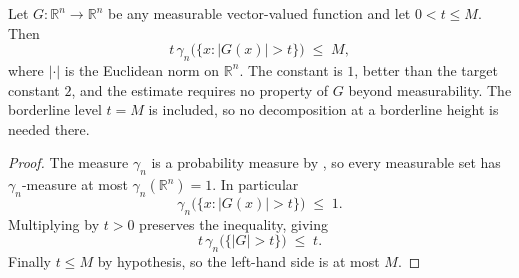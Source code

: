 \begin{lemma}
Let $G : \mathbb{R}^n \to \mathbb{R}^n$ be any measurable vector-valued function
and let $0 < t \leq M$.  Then
\[
  t\,\gamma_n\bigl(\{x : |G(x)| > t\}\bigr) \;\leq\; M ,
\]
where $|\cdot|$ is the Euclidean norm on $\mathbb{R}^n$.  The constant is $1$,
better than the target constant $2$, and the estimate requires no property of $G$
beyond measurability.  The borderline level $t = M$ is included, so no
decomposition at a borderline height is needed there.
\end{lemma}
\begin{proof}
The measure $\gamma_n$ is a probability measure by , so every
measurable set has $\gamma_n$-measure at most $\gamma_n(\mathbb{R}^n) = 1$.  In
particular
\[
  \gamma_n\bigl(\{x : |G(x)| > t\}\bigr) \;\leq\; 1 .
\]
Multiplying by $t > 0$ preserves the inequality, giving
\[
  t\,\gamma_n\bigl(\{|G|>t\}\bigr) \;\leq\; t .
\]
Finally $t \leq M$ by hypothesis, so the left-hand side is at most $M$.
\end{proof}
